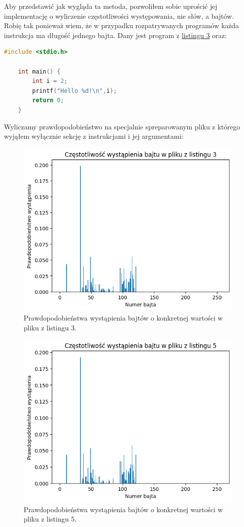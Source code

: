 Aby przedstawić jak wygląda ta metoda, pozwoliłem sobie uprościć jej implementację o wyliczenie
częstotliwości występowania, nie słów, a bajtów. Robię tak ponieważ wiem, że w przypadku rozpatrywanych programów każda instrukcja
ma długość jednego bajta. Dany jest program z \hyperref[lst:ello]{listingu 3} oraz:
\begin{lstlisting}[language=C,
    backgroundcolor=\color{EEGold!5!white},
    caption={Program podobny do programu z listingu 3. Jedyną różnicą jest obecność zmiennej $i$.},
    label={lst:helloC}]
    #include <stdio.h>

    int main() {
        int i = 2;
        printf("Hello %d!\n",i);
        return 0;
    }
\end{lstlisting}
Wyliczamy prawdopodobieństwo na specjalnie spreparowanym pliku z którego wyjąłem wyłącznie sekcję
z instrukcjami i jej argumentami:
\begin{figure}[H]
    \centering
    \includegraphics[width=0.9\linewidth]{rysunki/p1.png}
    \caption{Prawdopodobieństwa wystąpienia bajtów o konkretnej wartości w pliku z listingu 3.}
    \label{fig:enter-label}
\end{figure}
\begin{figure}[H]
    \centering
    \includegraphics[width=0.9\linewidth]{rysunki/p2.png}
    \caption{Prawdopodobieństwa wystąpienia bajtów o konkretnej wartości w pliku z listingu 5.}
    \label{fig:enter-label}
\end{figure}
